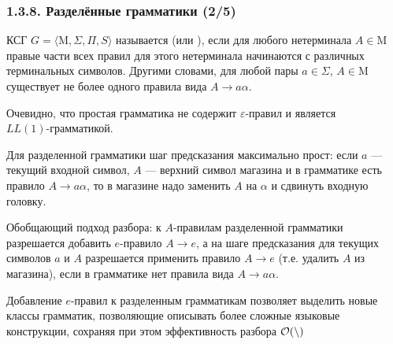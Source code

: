 \begin{frame}
\frametitle{1.3.8. Разделённые грамматики (2/5)}

КСГ $G=\langle \mathrm{M}, \Sigma, \Pi, S \rangle$ называется 
(или ),
если для любого нетерминала $A \in\mathrm{M}$
правые части всех правил для этого нетерминала
начинаются с различных терминальных символов.
Другими словами, для любой пары $a\in \Sigma$, $A\in \mathrm{M}$
существует не более одного правила вида $A\to a\alpha$. 
\begin{remark}
Очевидно, что простая грамматика не содержит $\varepsilon$-правил
и является \\$LL(1)$-грамматикой.
\end{remark}
Для разделенной грамматики шаг предсказания максимально прост: если \( a \) — текущий входной символ, \( A \) — верхний символ магазина и в грамматике есть правило \( A \to a \alpha \), то в магазине надо заменить \( A \) на \( \alpha \) и сдвинуть входную головку. 

\smallskip
Обобщающий подход разбора: к \( A \)-правилам разделенной грамматики разрешается добавить \( e \)-правило \( A \to e \), а на шаге предсказания для текущих символов \( a \) и \( A \) разрешается применить правило \( A \to e \) (т.е. удалить \( A \) из магазина), если в грамматике нет правила вида \( A \to a \alpha{} \).

\begin{remark}
 Добавление \( e \)-правил к разделенным грамматикам позволяет выделить новые классы грамматик, позволяющие описывать более сложные языковые конструкции, сохраняя при этом эффективность разбора $\cal{O}(n)$
\end{remark}

\end{frame}

